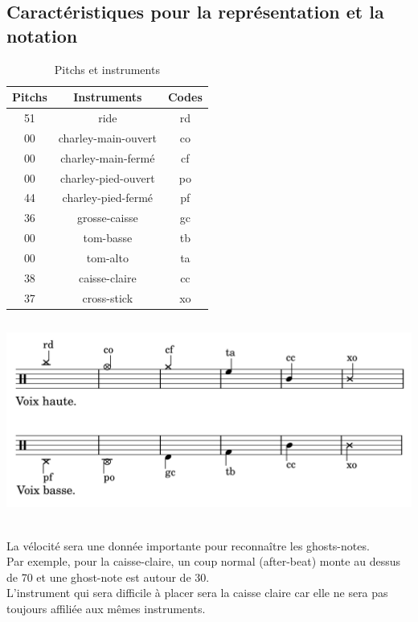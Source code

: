\subsection{Caractéristiques pour la représentation et la notation}

\begin{table}[h]
	\centering
	\begin{tabular}{|c|c|c|} \hline
		Pitchs & Instruments & Codes \\ \hline
		51 & ride & rd \\
		00 & charley-main-ouvert & co \\
		00 & charley-main-fermé & cf \\
		00 & charley-pied-ouvert & po \\
		44 & charley-pied-fermé & pf \\
		36 & grosse-caisse & gc \\
		00 & tom-basse & tb \\
		00 & tom-alto & ta \\
		38 & caisse-claire & cc \\
		37 & cross-stick & xo \\ \hline
	\end{tabular}
	\caption{Pitchs et instruments}
\end{table}
\includegraphics[height=65mm, width=150mm]{images/description_notation/description_notation.png}\\\\
La vélocité sera une donnée importante pour reconnaître les ghosts-notes.\\ Par exemple, pour la caisse-claire, un coup normal (after-beat) monte au dessus de 70 et une ghost-note est autour de 30.\\
L’instrument qui sera difficile à placer sera la caisse claire car elle ne sera pas toujours affiliée aux mêmes instruments.
